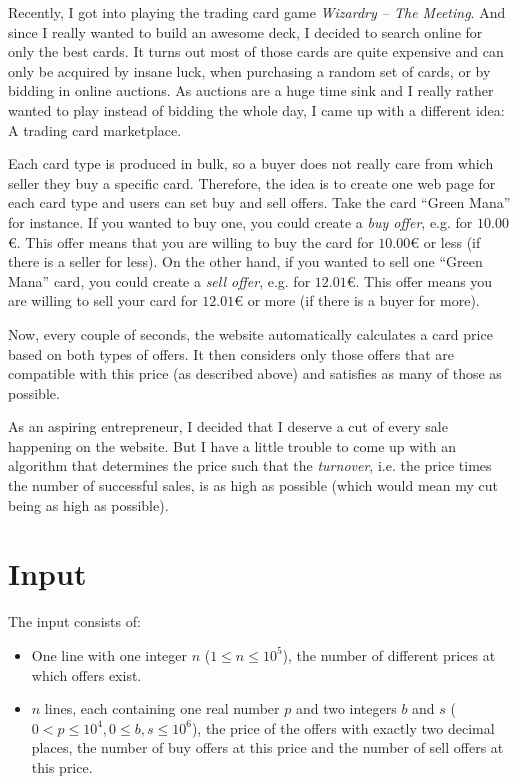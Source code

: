 
Recently, I got into playing the trading card game \textit{Wizardry -- The Meeting}. And since I really wanted to
build an awesome deck, I decided to search online for only the best cards. It turns out most of those cards are quite expensive
and can only be acquired by insane luck, when purchasing a random set of cards, or by bidding in online auctions. As auctions are
a huge time sink and I really rather wanted to play instead of bidding the whole day, I came up with a different idea: A trading
card marketplace.

Each card type is produced in bulk, so a buyer does not really care from which seller they buy a specific card. Therefore, the idea
is to create one web page for each card type and users can set buy and sell offers. Take the card ``Green Mana'' for instance. If you wanted to buy one,
you could create a \emph{buy offer}, e.g. for $10.00$€. This offer means that you are willing to buy the card for $10.00$€ or less (if there
is a seller for less). On the other hand, if you wanted to sell one ``Green Mana'' card, you could create a \emph{sell offer}, e.g. for $12.01$€.
This offer means you are willing to sell your card for $12.01$€ or more (if there is a buyer for more).

Now, every couple
of seconds, the website automatically calculates a card price based on both types of offers. It then considers only those offers
that are compatible with this price (as described above) and satisfies as many of those as possible.

As an aspiring entrepreneur, I decided that I deserve a cut of every sale happening on the website. But I have a little trouble to come
up with an algorithm that determines the price such that the \emph{turnover}, i.e. the price times the number of successful sales,
is as high as possible (which would mean my cut being as high as possible).

\section*{Input}
The input consists of:
\begin{itemize}
	\item One line with one integer $n$ ($1 \le n \le 10^{5}$), the number of different prices at which offers exist.
	\item $n$ lines, each containing one real number $p$ and two integers $b$ and $s$ ($0 < p \le 10^{4}, 0 \le b,s \le 10^{6}$),
				the price of the offers with exactly two decimal places, the number of buy offers at this price and the number of sell offers
				at this price.
\end{itemize}

